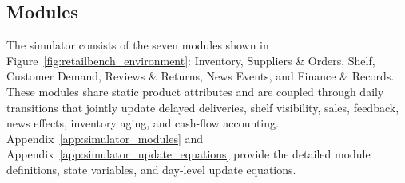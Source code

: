 \subsection{Modules}
\label{sec:module_logic}
The simulator consists of the seven modules shown in Figure~\ref{fig:retailbench_environment}: Inventory, Suppliers \& Orders, Shelf, Customer Demand, Reviews \& Returns, News Events, and Finance \& Records. These modules share static product attributes and are coupled through daily transitions that jointly update delayed deliveries, shelf visibility, sales, feedback, news effects, inventory aging, and cash-flow accounting. Appendix~\ref{app:simulator_modules} and Appendix~\ref{app:simulator_update_equations} provide the detailed module definitions, state variables, and day-level update equations.
